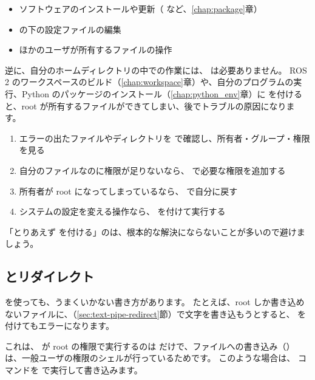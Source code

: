 \begin{itemize}
  \item ソフトウェアのインストールや更新（ など、\ref{chap:package}章）
  \item {} の下の設定ファイルの編集
  \item ほかのユーザが所有するファイルの操作
\end{itemize}

逆に、自分のホームディレクトリの中での作業には、 は必要ありません。
ROS 2 のワークスペースのビルド（\ref{chap:workspace}章）や、自分のプログラムの実行、Python のパッケージのインストール（\ref{chap:python_env}章）に  を付けると、root が所有するファイルができてしまい、後でトラブルの原因になります。

\begin{point}
  \begin{enumerate}
    \item エラーの出たファイルやディレクトリを  で確認し、所有者・グループ・権限を見る
    \item 自分のファイルなのに権限が足りないなら、 で必要な権限を追加する
    \item 所有者が root になってしまっているなら、 で自分に戻す
    \item システムの設定を変える操作なら、 を付けて実行する
  \end{enumerate}
  「とりあえず  を付ける」のは、根本的な解決にならないことが多いので避けましょう。
\end{point}

\subsection{ とリダイレクト}

 を使っても、うまくいかない書き方があります。
たとえば、root しか書き込めないファイルに、\cmd{>}（\ref{sec:text-pipe-redirect}節）で文字を書き込もうとすると、 を付けてもエラーになります。


これは、 が root の権限で実行するのは  だけで、ファイルへの書き込み（\cmd{>}）は、一般ユーザの権限のシェルが行っているためです。
このような場合は、 コマンドを  で実行して書き込みます。

